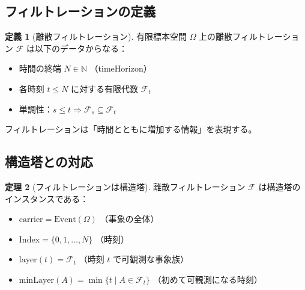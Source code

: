 \documentclass[a4paper,12pt]{ltjsarticle}
\theoremstyle{definition}
\newtheorem{definition}{定義}[section]
\newtheorem{theorem}[definition]{定理}
\begin{document}
\subsection{フィルトレーションの定義}

\begin{definition}[離散フィルトレーション]
有限標本空間 $\Omega$ 上の離散フィルトレーション $\mathcal{F}$ は以下のデータからなる：
\begin{itemize}
\item 時間の終端 $N \in \mathbb{N}$ （timeHorizon）
\item 各時刻 $t \leq N$ に対する有限代数 $\mathcal{F}_t$
\item 単調性：$s \leq t \Rightarrow \mathcal{F}_s \subseteq \mathcal{F}_t$
\end{itemize}
\end{definition}

\begin{center}
\end{center}

フィルトレーションは「時間とともに増加する情報」を表現する。

\subsection{構造塔との対応}

\begin{theorem}[フィルトレーションは構造塔]
離散フィルトレーション $\mathcal{F}$ は構造塔のインスタンスである：
\begin{itemize}
\item $\text{carrier} = \text{Event}(\Omega)$ （事象の全体）
\item $\text{Index} = \{0, 1, \ldots, N\}$ （時刻）
\item $\text{layer}(t) = \mathcal{F}_t$ （時刻 $t$ で可観測な事象族）
\item $\text{minLayer}(A) = \min\{t \mid A \in \mathcal{F}_t\}$ （初めて可観測になる時刻）
\end{itemize}
\end{theorem}
\end{document}
